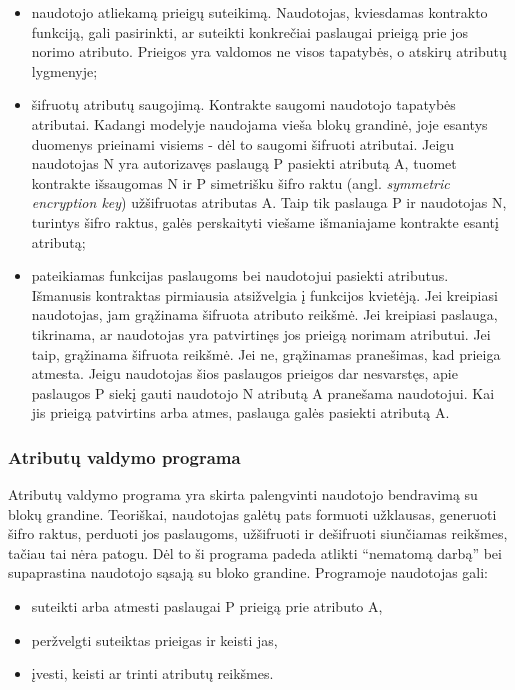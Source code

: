 \begin{itemize}
    \item naudotojo atliekamą prieigų suteikimą. Naudotojas, kviesdamas kontrakto funkciją, gali pasirinkti,
    ar suteikti konkrečiai paslaugai prieigą prie jos norimo atributo. Prieigos yra valdomos ne visos tapatybės, o
    atskirų atributų lygmenyje;

    \item šifruotų atributų saugojimą. Kontrakte saugomi naudotojo tapatybės atributai. Kadangi modelyje naudojama vieša blokų
    grandinė, joje esantys duomenys prieinami visiems - dėl to saugomi šifruoti atributai. Jeigu naudotojas N
    yra autorizavęs paslaugą P pasiekti atributą A, tuomet kontrakte išsaugomas N ir P simetrišku šifro raktu (angl.
    \textit{symmetric encryption key}) užšifruotas atributas A. Taip tik paslauga P
    ir naudotojas N, turintys šifro raktus, galės perskaityti viešame išmaniajame kontrakte esantį atributą;

    \item pateikiamas funkcijas paslaugoms bei naudotojui pasiekti atributus. Išmanusis kontraktas pirmiausia atsižvelgia
    į funkcijos kvietėją. Jei kreipiasi naudotojas, jam grąžinama šifruota atributo reikšmė. Jei kreipiasi paslauga, tikrinama,
    ar naudotojas yra patvirtinęs jos prieigą norimam atributui. Jei taip, grąžinama šifruota reikšmė. Jei ne, grąžinamas pranešimas,
    kad prieiga atmesta. Jeigu naudotojas šios paslaugos prieigos dar nesvarstęs, apie paslaugos P siekį gauti naudotojo N atributą A
    pranešama naudotojui. Kai jis prieigą patvirtins arba atmes, paslauga galės pasiekti atributą A.
\end{itemize}

\subsubsection{Atributų valdymo programa}

Atributų valdymo programa yra skirta palengvinti naudotojo bendravimą su blokų grandine. Teoriškai, naudotojas galėtų pats formuoti užklausas,
generuoti šifro raktus, perduoti jos paslaugoms, užšifruoti ir dešifruoti siunčiamas reikšmes, tačiau tai nėra patogu. Dėl to ši
programa padeda atlikti \enquote{nematomą darbą} bei supaprastina naudotojo sąsają su bloko grandine. Programoje naudotojas gali:

\begin{itemize}
    \item suteikti arba atmesti paslaugai P prieigą prie atributo A,
    \item peržvelgti suteiktas prieigas ir keisti jas,
    \item įvesti, keisti ar trinti atributų reikšmes.
\end{itemize}

